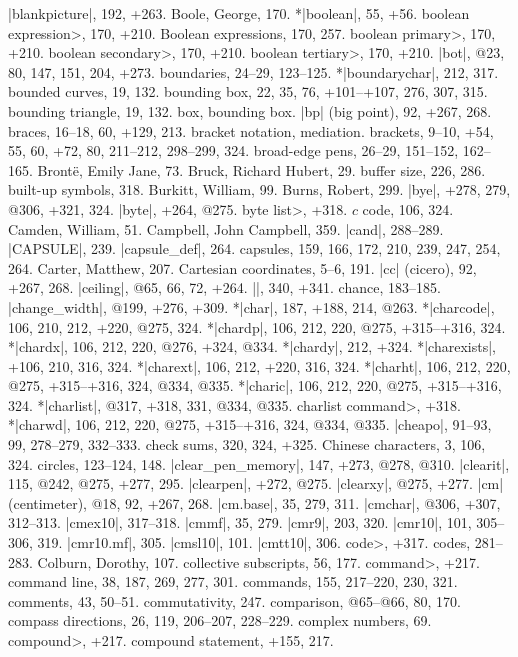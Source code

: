 |blankpicture|, 192, +263.
Boole, George, 170.
*|boolean|, 55, +56.
\<boolean expression>, 170, +210.
Boolean expressions, 170, 257.
\<boolean primary>, 170, +210.
\<boolean secondary>, 170, +210.
\<boolean tertiary>, 170, +210.
|bot|, @23, 80, 147, 151, 204, +273.
boundaries, 24--29, 123--125.
*|boundarychar|, 212, 317.
bounded curves, 19, 132.
bounding box, 22, 35, 76, +101--+107, 276, 307, 315.
bounding triangle, 19, 132.
box, \see bounding box.
|bp| (big point), 92, +267, 268.
braces, 16--18, 60, +129, 213.
bracket notation, \see mediation.
brackets, 9--10, +54, 55, 60, +72, 80, 211--212, 298--299, 324.
broad-edge pens, 26--29, 151--152, 162--165.
Bront\"e, Emily Jane, 73.
Bruck, Richard Hubert, 29.
buffer size, 226, 286.
built-up symbols, 318.
Burkitt, William, 99.
Burns, Robert, 299.
|bye|, +278, 279, @306, +321, 324.
|byte|, +264, @275.
\<byte list>, +318.
\newletter
$c$ code, 106, 324.
Camden, William, 51.
Campbell, John Campbell, 359.
|cand|, 288--289.
|CAPSULE|, 239.
|capsule_def|, 264.
capsules, 159, 166, 172, 210, 239, 247, 254, 264.
Carter, Matthew, 207.
Cartesian coordinates, 5--6, 191.
|cc| (cicero), 92, +267, 268.
|ceiling|, @65, 66, 72, +264.
|\centerlargechars|, 340, +341.
chance, 183--185.
|change_width|, @199, +276, +309.
*|char|, 187, +188, 214, @263.
*|charcode|, 106, 210, 212, +220, @275, 324.
*|chardp|, 106, 212, 220, @275, +315--+316, 324.
*|chardx|, 106, 212, 220, @276, +324, @334.
*|chardy|, 212, +324.
*|charexists|, +106, 210, 316, 324.
*|charext|, 106, 212, +220, 316, 324.
*|charht|, 106, 212, 220, @275, +315--+316, 324, @334, @335.
*|charic|, 106, 212, 220, @275, +315--+316, 324.
*|charlist|, @317, +318, 331, @334, @335.
\<charlist command>, +318.
*|charwd|, 106, 212, 220, @275, +315--+316, 324, @334, @335.
|cheapo|, 91--93, 99, 278--279, 332--333.
check sums, 320, 324, +325.
Chinese characters, 3, 106, 324.
circles, 123--124, 148.
|clear_pen_memory|, 147, +273, @278, @310.
|clearit|, 115, @242, @275, +277, 295.
|clearpen|, +272, @275.
|clearxy|, @275, +277.
|cm| (centimeter), @18, 92, +267, 268.
|cm.base|, 35, 279, 311.
|cmchar|, @306, +307, 312--313.
|cmex10|, 317--318.
|cmmf|, 35, 279.
|cmr9|, 203, 320.
|cmr10|, 101, 305--306, 319.
|cmr10.mf|, 305.
|cmsl10|, 101.
|cmtt10|, 306.
\<code>, +317.
codes, 281--283.
Colburn, Dorothy, 107.
collective subscripts, 56, 177.
\<command>, +217.
command line, 38, 187, 269, 277, 301.
commands, 155, 217--220, 230, 321.
comments, 43, 50--51.
commutativity, 247.
comparison, @65--@66, 80, 170.
compass directions, 26, 119, 206--207, 228--229.
complex numbers, 69.
\<compound>, +217.
compound statement, +155, 217.
